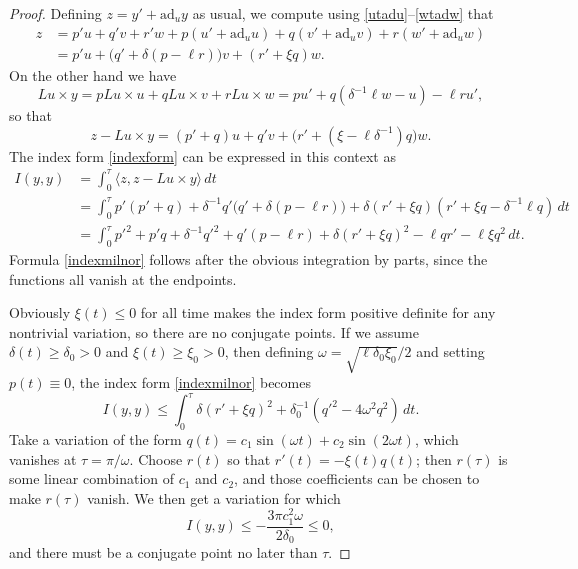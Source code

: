 \documentclass[oneside, 11pt]{amsart}
\numberwithin{equation}{section}
\newcommand{\ad}{\mathrm{ad}}
\begin{document}
\begin{proof}
Defining $z=y'+\ad_uy$ as usual, we compute using \eqref{utadu}--\eqref{wtadw} that 
\begin{align*}
z &= p'u + q'v + r'w + p(u'+\ad_uu) + q(v'+\ad_uv) + r(w'+\ad_uw) \\
&= p'u + \big( q' + \delta (p- \ell r)\big) v + (r' + \xi q)w.
\end{align*}
On the other hand we have 
$$ Lu\times y = p Lu\times u + q Lu\times v + r Lu \times w = pu' + q(\delta^{-1} \ell w - u) - \ell r u',$$
so that 
$$ z - Lu\times y = (p'+q) u  + q'v + (r'+(\xi-\ell\delta^{-1}) q\big) w.$$
The index form \eqref{indexform} can be expressed in this context as 
\begin{align*} 
I(y,y) &= \int_0^{\tau} \langle z, z-Lu\times y\rangle \, dt \\
&= \int_0^{\tau} p'(p'+q) + \delta^{-1} q'\big(q'+\delta (p-\ell r)\big) + 
\delta (r'+\xi q)(r'+\xi q - \delta^{-1} \ell q) \, dt \\
&= \int_0^{\tau}  p'^2 + p'q + \delta^{-1} q'^2 + q'(p-\ell r)  + \delta (r'+\xi q)^2  - 
\ell q r' - \ell \xi q^2  \, dt.
\end{align*}
Formula \eqref{indexmilnor} follows after the obvious integration by parts, since the functions all vanish at the endpoints.

Obviously $\xi(t)\le 0$ for all time makes the index form positive definite for any nontrivial variation, so there are no conjugate points. 
If we assume $\delta(t)\ge \delta_0>0$ and $\xi(t)\ge \xi_0>0$, then defining $\omega = \sqrt{\ell\delta_0\xi_0}/2$ and setting $p(t)\equiv 0$, 
the index form \eqref{indexmilnor} becomes 
$$ I(y,y) \le \int_0^{\tau} \delta (r' + \xi q)^2 + \delta_0^{-1} (q'^2 - 4\omega^2 q^2) \, dt.$$
Take a variation of the form $q(t) = c_1 \sin{(\omega t)} + c_2 \sin{(2\omega t)}$, which vanishes at $\tau=\pi/\omega$. Choose $r(t)$ so that $r'(t) = -\xi(t) q(t)$; then $r(\tau)$ is some linear combination of $c_1$ and $c_2$, and those coefficients can be chosen to make $r(\tau)$ vanish. We then get a variation for which 
$$I(y,y) \le -\frac{3\pi c_1^2 \omega}{2\delta_0} \le 0,$$
and there must be a conjugate point no later than $\tau$. 
\end{proof}
  
\end{document}
